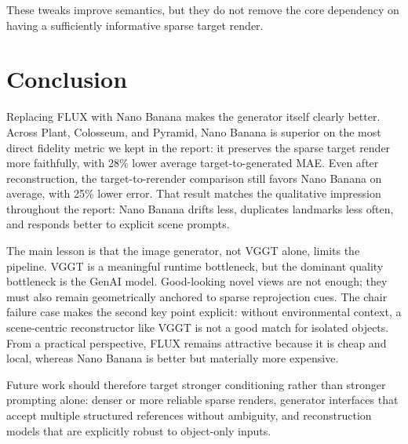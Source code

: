 \documentclass[11pt]{article}
\begin{document}
These tweaks improve semantics, but they do not remove the core dependency on having a sufficiently informative sparse target render.

\section{Conclusion}
Replacing FLUX with Nano Banana makes the generator itself clearly better. Across Plant, Colosseum, and Pyramid, Nano Banana is superior on the most direct fidelity metric we kept in the report: it preserves the sparse target render more faithfully, with 28\% lower average target-to-generated MAE. Even after reconstruction, the target-to-rerender comparison still favors Nano Banana on average, with 25\% lower error. That result matches the qualitative impression throughout the report: Nano Banana drifts less, duplicates landmarks less often, and responds better to explicit scene prompts.

The main lesson is that the image generator, not VGGT alone, limits the pipeline. VGGT is a meaningful runtime bottleneck, but the dominant quality bottleneck is the GenAI model. Good-looking novel views are not enough; they must also remain geometrically anchored to sparse reprojection cues. The chair failure case makes the second key point explicit: without environmental context, a scene-centric reconstructor like VGGT is not a good match for isolated objects. From a practical perspective, FLUX remains attractive because it is cheap and local, whereas Nano Banana is better but materially more expensive.

Future work should therefore target stronger conditioning rather than stronger prompting alone: denser or more reliable sparse renders, generator interfaces that accept multiple structured references without ambiguity, and reconstruction models that are explicitly robust to object-only inputs.



\end{document}
